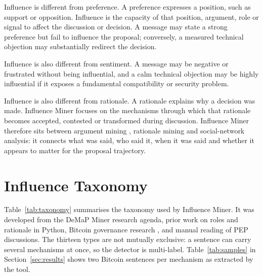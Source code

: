 \documentclass[sigconf,screen]{acmart}
\begin{document}
Influence is different from preference. A preference expresses a position, such as support or opposition. Influence is the capacity of that position, argument, role or signal to affect the discussion or decision. A message may state a strong preference but fail to influence the proposal; conversely, a measured technical objection may substantially redirect the decision.

Influence is also different from sentiment. A message may be negative or frustrated without being influential, and a calm technical objection may be highly influential if it exposes a fundamental compatibility or security problem.

Influence is also different from rationale. A rationale explains why a decision was made. Influence Miner focuses on the mechanisms through which that rationale becomes accepted, contested or transformed during discussion. Influence Miner therefore sits between argument mining \cite{argumentMining}, rationale mining and social-network analysis: it connects what was said, who said it, when it was said and whether it appears to matter for the proposal trajectory.

\section{Influence Taxonomy}

Table~\ref{tab:taxonomy} summarises the taxonomy used by Influence Miner. It was developed from the DeMaP Miner research agenda, prior work on roles and rationale in Python, Bitcoin governance research \cite{thapa2021bitcoin}, and manual reading of PEP discussions. The thirteen types are not mutually exclusive: a sentence can carry several mechanisms at once, so the detector is multi-label. Table~\ref{tab:samples} in Section~\ref{sec:results} shows two Bitcoin sentences per mechanism as extracted by the tool.
\end{document}
